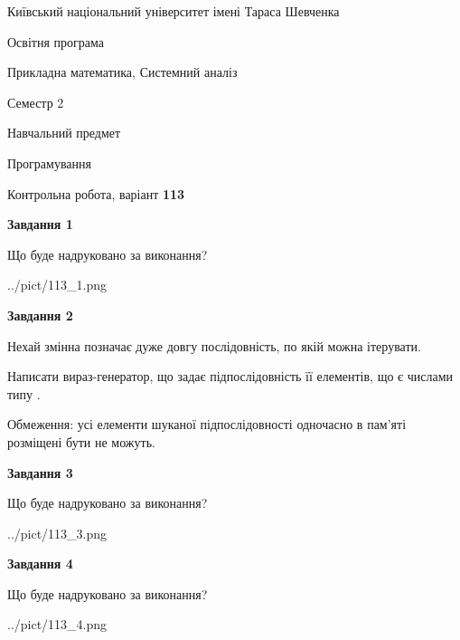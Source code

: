 \documentclass[12pt, ukrainian]{article}
\begin{document}
{{\begin {small}\par
{ \center  Київський національний університет імені Тараса Шевченка \par}
{\parbox {5 cm}{Освітня програма \hfill}{\parbox {8 cm}{Прикладна математика, Системний аналіз \hfill}}\parbox {5 cm}{\hfill Семестр 2}}\par
{\parbox {5 cm} {Навчальний предмет \hfill}\parbox {7 cm}{Програмування \hfill}\parbox {6cm}{\hfill}\par}\vspace{-7pt} \end{small}}{\center Контрольна робота, варіант  \No \textbf
{ 113 }\par}}
{
\begin {large}
{\begin {center}\textbf{Завдання 1}\end {center}}\par
Що буде надруковано за виконання?\par\par
\begin{center}
	{../pict/113_1.png}
\end{center}
\newpage

{\begin {center}\textbf{Завдання 2}\end {center}}\par
Нехай змінна  позначає дуже довгу послідовність, по якій можна ітерувати.

Написати вираз-генератор, що задає підпослідовність її елементів, що є числами типу .

Обмеження: усі елементи шуканої підпослідовності одночасно в пам'яті розміщені бути не можуть.\par
\newpage

{\begin {center}\textbf{Завдання 3}\end {center}}\par
Що буде надруковано за виконання?
\begin{center}
	{../pict/113_3.png}
\end{center}
\newpage

{\begin {center}\textbf{Завдання 4}\end {center}}\par
Що буде надруковано за виконання?\par
\begin{center}
	{../pict/113_4.png}
\end{center}
\newpage


\end{large}}
\end{document}
